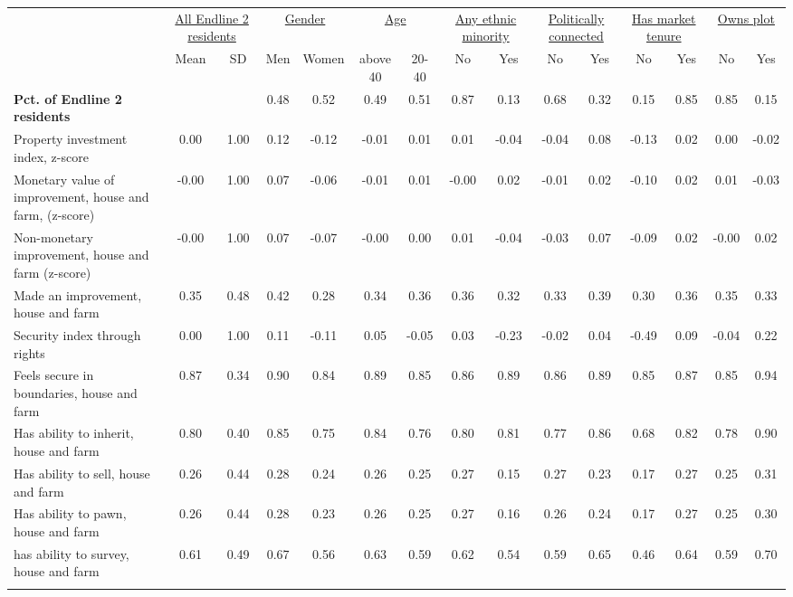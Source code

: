 \begin{tabular}{lcccccccccccccc}
\hline \noalign{\smallskip} & \multicolumn{2}{c}{\uline{\hfill All Endline 2 residents}} & \multicolumn{2}{c}{\uline{\hfill Gender \hfill}} & \multicolumn{2}{c}{\uline{\hfill Age \hfill}} & \multicolumn{2}{c}{\uline{\hfill Any ethnic minority \hfill}} & \multicolumn{2}{c}{\uline{\hfill Politically connected \hfill}} & \multicolumn{2}{c}{\uline{\hfill Has market tenure \hfill}} & \multicolumn{2}{c}{\uline{\hfill Owns plot \hfill}}\\
 & Mean & SD & Men & Women & above 40 & 20-40 & No & Yes & No & Yes & No & Yes & No & Yes\\
\noalign{\smallskip}\hline \noalign{\smallskip}\textbf{Pct. of Endline 2 residents} &  &  & 0.48 & 0.52 & 0.49 & 0.51 & 0.87 & 0.13 & 0.68 & 0.32 & 0.15 & 0.85 & 0.85 & 0.15\\
Property investment index, z-score & 0.00 & 1.00 & 0.12 & -0.12 & -0.01 & 0.01 & 0.01 & -0.04 & -0.04 & 0.08 & -0.13 & 0.02 & 0.00 & -0.02\\
\quad Monetary value of improvement, house and farm, (z-score) & -0.00 & 1.00 & 0.07 & -0.06 & -0.01 & 0.01 & -0.00 & 0.02 & -0.01 & 0.02 & -0.10 & 0.02 & 0.01 & -0.03\\
\quad Non-monetary improvement, house and farm (z-score) & -0.00 & 1.00 & 0.07 & -0.07 & -0.00 & 0.00 & 0.01 & -0.04 & -0.03 & 0.07 & -0.09 & 0.02 & -0.00 & 0.02\\
\quad Made an improvement, house and farm & 0.35 & 0.48 & 0.42 & 0.28 & 0.34 & 0.36 & 0.36 & 0.32 & 0.33 & 0.39 & 0.30 & 0.36 & 0.35 & 0.33\\
Security index through rights & 0.00 & 1.00 & 0.11 & -0.11 & 0.05 & -0.05 & 0.03 & -0.23 & -0.02 & 0.04 & -0.49 & 0.09 & -0.04 & 0.22\\
\quad Feels secure in boundaries, house and farm & 0.87 & 0.34 & 0.90 & 0.84 & 0.89 & 0.85 & 0.86 & 0.89 & 0.86 & 0.89 & 0.85 & 0.87 & 0.85 & 0.94\\
\quad Has ability to inherit, house and farm & 0.80 & 0.40 & 0.85 & 0.75 & 0.84 & 0.76 & 0.80 & 0.81 & 0.77 & 0.86 & 0.68 & 0.82 & 0.78 & 0.90\\
\quad Has ability to sell, house and farm & 0.26 & 0.44 & 0.28 & 0.24 & 0.26 & 0.25 & 0.27 & 0.15 & 0.27 & 0.23 & 0.17 & 0.27 & 0.25 & 0.31\\
\quad Has ability to pawn, house and farm & 0.26 & 0.44 & 0.28 & 0.23 & 0.26 & 0.25 & 0.27 & 0.16 & 0.26 & 0.24 & 0.17 & 0.27 & 0.25 & 0.30\\
\quad has ability to survey, house and farm & 0.61 & 0.49 & 0.67 & 0.56 & 0.63 & 0.59 & 0.62 & 0.54 & 0.59 & 0.65 & 0.46 & 0.64 & 0.59 & 0.70\\
\noalign{\smallskip}\hline\end{tabular}
